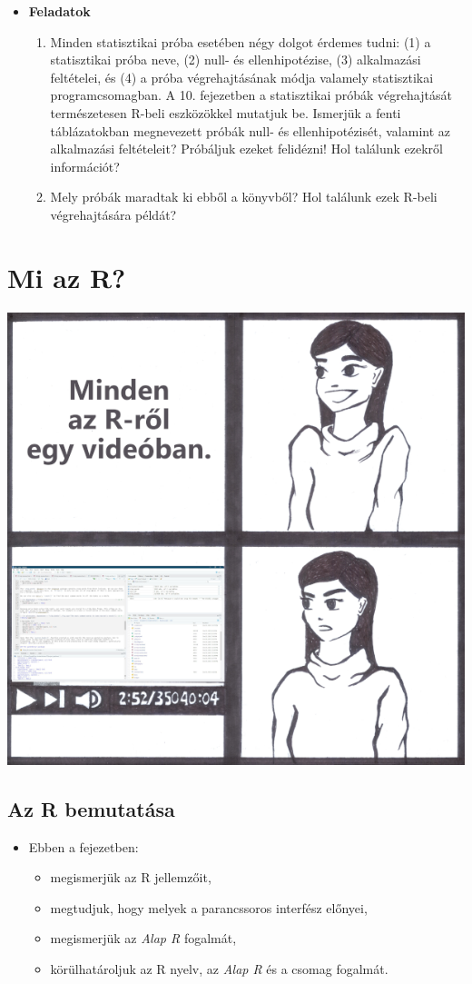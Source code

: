 \documentclass[
]{book}
\providecommand{\tightlist}{%
  \setlength{\itemsep}{0pt}\setlength{\parskip}{0pt}}
\newenvironment{rmdblock}[1]
  {\begin{shaded*}
  \begin{itemize}
  \renewcommand{\labelitemi}{
    \raisebox{-.7\height}[0pt][0pt]{
      {\setkeys{Gin}{width=3em,keepaspectratio}\texttt{[image: images/\#1]}}
    }
  }
  \item
  }
  {
  \end{itemize}
  \end{shaded*}
  }
\newenvironment{rmdlevel1}
  {\begin{rmdblock}{level1}}
  {\end{rmdblock}}
\newenvironment{rmdexercise}
  {\begin{rmdblock}{exercise}}
  {\end{rmdblock}}
\begin{document}
\begin{rmdexercise}
\textbf{Feladatok}

\begin{enumerate}
\def\labelenumi{\arabic{enumi}.}
\tightlist
\item
  Minden statisztikai próba esetében négy dolgot érdemes tudni: (1) a statisztikai próba neve, (2) null- és ellenhipotézise, (3) alkalmazási feltételei, és (4) a próba végrehajtásának módja valamely statisztikai programcsomagban. A 10. fejezetben a statisztikai próbák végrehajtását természetesen R-beli eszközökkel mutatjuk be. Ismerjük a fenti táblázatokban megnevezett próbák null- és ellenhipotézisét, valamint az alkalmazási feltételeit? Próbáljuk ezeket felidézni! Hol találunk ezekről információt?
\item
  Mely próbák maradtak ki ebből a könyvből? Hol találunk ezek R-beli végrehajtására példát?
\end{enumerate}
\end{rmdexercise}

\hypertarget{mi-az-r}{%
\chapter{Mi az R?}\label{mi-az-r}}

\begin{center}\includegraphics[width=0.6\linewidth]{images/ch_02_small} \end{center}

\hypertarget{az-r-bemutatuxe1sa}{%
\section{Az R bemutatása}\label{az-r-bemutatuxe1sa}}

\begin{rmdlevel1}
Ebben a fejezetben:

\begin{itemize}
\tightlist
\item
  megismerjük az R jellemzőit,
\item
  megtudjuk, hogy melyek a parancssoros interfész előnyei,
\item
  megismerjük az \emph{Alap R} fogalmát,
\item
  körülhatároljuk az R nyelv, az \emph{Alap R} és a csomag fogalmát.
\end{itemize}
\end{rmdlevel1}
\end{document}
